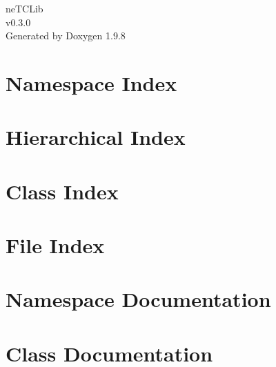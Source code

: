 \documentclass[twoside]{book}
\newcommand{\+}{\discretionary{\mbox{\scriptsize$\hookleftarrow$}}{}{}}
\newcommand{\clearemptydoublepage}{%
    \newpage{\pagestyle{empty}\cleardoublepage}%
  }
\begin{document}
  \raggedbottom
    \hypersetup{pageanchor=false,
                bookmarksnumbered=true,
                pdfencoding=unicode
               }
  \begin{titlepage}
  \vspace*{7cm}
  \begin{center}%
  {\Large ne\+TCLib}\\
  [1ex]\large v0.\+3.\+0 \\
  \vspace*{1cm}
  {\large Generated by Doxygen 1.9.8}\\
  \end{center}
  \end{titlepage}
  \clearemptydoublepage
  \tableofcontents
  \clearemptydoublepage
  \hypersetup{pageanchor=true}
\chapter{Namespace Index}

\chapter{Hierarchical Index}

\chapter{Class Index}

\chapter{File Index}

\chapter{Namespace Documentation}


\chapter{Class Documentation}










\end{document}
